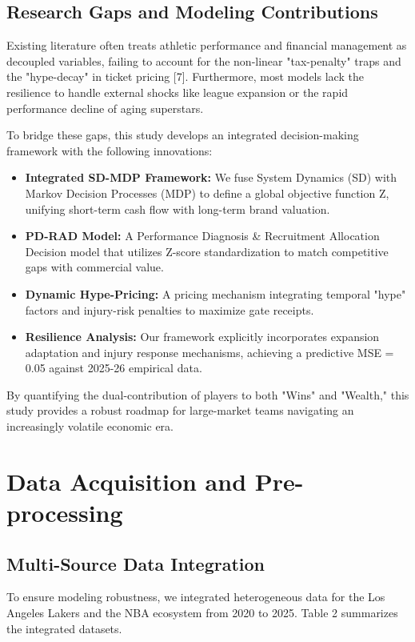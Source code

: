 \documentclass[12pt]{article}
\begin{document}
\subsection{Research Gaps and Modeling Contributions}
Existing literature often treats athletic performance and financial management as decoupled variables, failing to account for the non-linear "tax-penalty" traps and the "hype-decay" in ticket pricing [7]. Furthermore, most models lack the resilience to handle external shocks like league expansion or the rapid performance decline of aging superstars.

To bridge these gaps, this study develops an integrated decision-making framework with the following innovations:
\begin{itemize}
    \item \textbf{Integrated SD-MDP Framework:} We fuse System Dynamics (SD) with Markov Decision Processes (MDP) to define a global objective function Z, unifying short-term cash flow with long-term brand valuation.
    \item \textbf{PD-RAD Model:} A Performance Diagnosis \& Recruitment Allocation Decision model that utilizes Z-score standardization to match competitive gaps with commercial value.
    \item \textbf{Dynamic Hype-Pricing:} A pricing mechanism integrating temporal "hype" factors and injury-risk penalties to maximize gate receipts.
    \item \textbf{Resilience Analysis:} Our framework explicitly incorporates expansion adaptation and injury response mechanisms, achieving a predictive MSE = 0.05 against 2025-26 empirical data.
\end{itemize}

By quantifying the dual-contribution of players to both "Wins" and "Wealth," this study provides a robust roadmap for large-market teams navigating an increasingly volatile economic era.

\section{Data Acquisition and Pre-processing}

\subsection{Multi-Source Data Integration}
To ensure modeling robustness, we integrated heterogeneous data for the Los Angeles Lakers and the NBA ecosystem from 2020 to 2025. Table 2 summarizes the integrated datasets.
\end{document}
